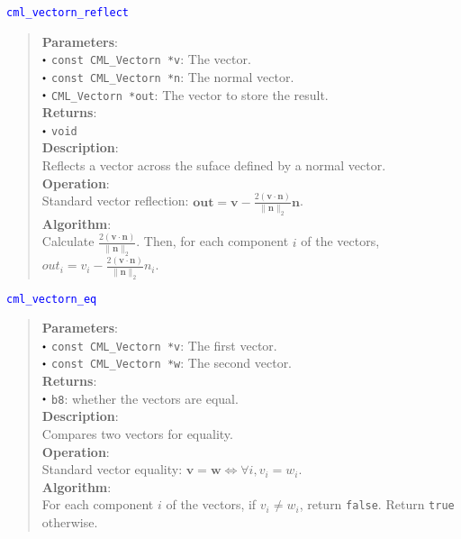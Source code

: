\documentclass[a4paper,oneside,8pt]{extarticle}
\newcommand{\function}[1]{
  \noindent\textcolor{blue}{\texttt{#1}}
  \vspace{-0.3em}
}
\renewcommand{\dot}{\raisebox{0.3ex}{\scalebox{0.6}{$\bullet$}}}
\theoremstyle{definition}
\begin{document}
\function{cml\_vectorn\_reflect}
\begin{quote}
  \textbf{Parameters}: \\
  $\dot$ \texttt{const CML\_Vectorn *v}: The vector. \\
  $\dot$ \texttt{const CML\_Vectorn *n}: The normal vector. \\
  $\dot$ \texttt{CML\_Vectorn *out}: The vector to store the result. \\
  \textbf{Returns}: \\
  $\dot$ \texttt{void} \\

  \vspace{-0.75em}
  \textbf{Description}: \\
  Reflects a vector across the suface defined by a normal vector. \\

  \vspace{-0.75em}
  \textbf{Operation}: \\
  Standard vector reflection: $\mathbf{out} = \mathbf{v} - \frac{2(\mathbf{v} \cdot \mathbf{n})}{\lVert\mathbf{n}\rVert_2}\mathbf{n}$. \\

  \vspace{-0.75em}
  \textbf{Algorithm}: \\
  Calculate $\frac{2(\mathbf{v} \cdot \mathbf{n})}{\lVert\mathbf{n}\rVert_2}$. Then, for each component $i$ of the vectors, $out_i = v_i - \frac{2(\mathbf{v} \cdot \mathbf{n})}{\lVert\mathbf{n}\rVert_2}n_i$. \\
\end{quote}

\function{cml\_vectorn\_eq}
\begin{quote}
  \textbf{Parameters}: \\
  $\dot$ \texttt{const CML\_Vectorn *v}: The first vector. \\
  $\dot$ \texttt{const CML\_Vectorn *w}: The second vector. \\
  \textbf{Returns}: \\
  $\dot$ \texttt{b8}: whether the vectors are equal. \\

  \vspace{-0.75em}
  \textbf{Description}: \\
  Compares two vectors for equality. \\

  \vspace{-0.75em}
  \textbf{Operation}: \\
  Standard vector equality: $\mathbf{v} = \mathbf{w} \Leftrightarrow \forall i, v_i = w_i$. \\

  \vspace{-0.75em}
  \textbf{Algorithm}: \\
  For each component $i$ of the vectors, if $v_i \neq w_i$, return \texttt{false}. Return \texttt{true} otherwise. \\
\end{quote}
\end{document}
